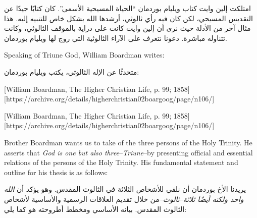 امتلكت إلين وايت كتاب ويليام بوردمان “الحياة المسيحية الأسمى”. كان كتابًا جيدًا عن التقديس المسيحي، لكن كان فيه رأي ثالوثي، أرشدها الله بشكل خاص للتنبيه إليه. هذا مثال آخر من الأدلة حيث نرى أن إلين وايت كانت على دراية بالموقف الثالوثي، وكانت تتناوله مباشرة. دعونا نتعرف على الآراء الثالوثية التي روج لها ويليام بوردمان.


Speaking of Triune God, William Boardman writes:


متحدثًا عن الإله الثالوثي، يكتب ويليام بوردمان:


[William Boardman, The Higher Christian Life, p. 99; 1858][https://archive.org/details/higherchristian02boargoog/page/n106/]


[William Boardman, The Higher Christian Life, p. 99; 1858][https://archive.org/details/higherchristian02boargoog/page/n106/]


Brother Boardman wants us to take  of the three persons of the Holy Trinity. He asserts that \textit{God is one but also three}–\textit{Triune}–by presenting official and essential relations of the persons of the Holy Trinity. His fundamental statement and outline for his thesis is as follows:


يريدنا الأخ بوردمان أن نلقي  للأشخاص الثلاثة في الثالوث المقدس. وهو يؤكد أن \textit{الله واحد ولكنه أيضًا ثلاثة}–\textit{ثالوث}–من خلال تقديم العلاقات الرسمية والأساسية لأشخاص الثالوث المقدس. بيانه الأساسي ومخطط أطروحته هو كما يلي:


